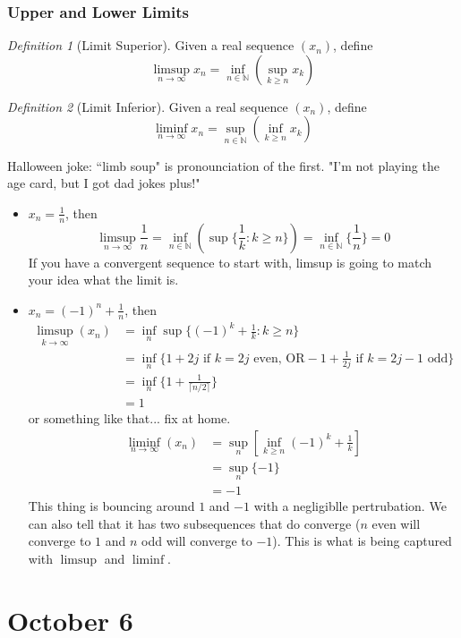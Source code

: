 \documentclass{article}
\theoremstyle{plain}
\theoremstyle{remark}
\newtheorem{definition}{Definition}
\newcommand{\N}{{\mathbb N}}
\begin{document}
\subsubsection{Upper and Lower Limits}
\begin{definition}[Limit Superior]
	Given a real sequence $(x_n)$, define
	\[
		\limsup_{n\to\infty} x_n = \inf_{n\in\N}\left(\sup_{k\geq n} x_k\right)
	\]
\end{definition}
\begin{definition}[Limit Inferior]
	Given a real sequence $(x_n)$, define
	\[
		\liminf_{n\to\infty} x_n = \sup_{n\in\N}\left(\inf_{k\geq n} x_k\right)
	\]
\end{definition}
Halloween joke: ``limb soup" is pronounciation of the first.
"I'm not playing the age card, but I got dad jokes plus!"
\begin{itemize}
	\item $x_n = \frac{1}{n}$, then
		\[
			\limsup_{n\to\infty} \frac{1}{n} =
			\inf_{n\in\N}\left(\sup\{\frac{1}{k} \colon k \geq n\}\right)
			= \inf_{n\in\N} \{\frac{1}{n}\} = 0
		\]
		If you have a convergent sequence to start with,
		limsup is going to match your idea what the limit is.
	\item $x_n = (-1)^n + \frac{1}{n}$, then
		\begin{align*}
			\limsup_{k\to\infty} (x_n)
			&= \inf_n \sup\{(-1)^k + \frac{1}{k} \colon k \geq n\}\\
			&= \inf_n \{1+2j \text{ if }k=2j \text{ even, OR}
			-1+\frac{1}{2j} \text{ if }k=2j-1 \text{ odd}\}\\
			&= \inf_n\{1+\frac{1}{\lceil n/2 \rceil}\}\\
			&= 1
		\end{align*}
		or something like that... fix at home.
		\begin{align*}
			\liminf_{n\to\infty}(x_n)
			&= \sup_n[\inf_{k\geq n} (-1)^k + \frac{1}{k}]\\
			&= \sup_n\{-1\}\\
			&= -1
		\end{align*}
		This thing is bouncing around $1$ and $-1$ with a negligiblle pertrubation.
		We can also tell that it has two subsequences that do converge
		($n$ even will converge to $1$ and $n$ odd will converge to $-1$).
		This is what is being captured with $\limsup$ and $\liminf$.
\end{itemize}

\section{October 6}
\end{document}
